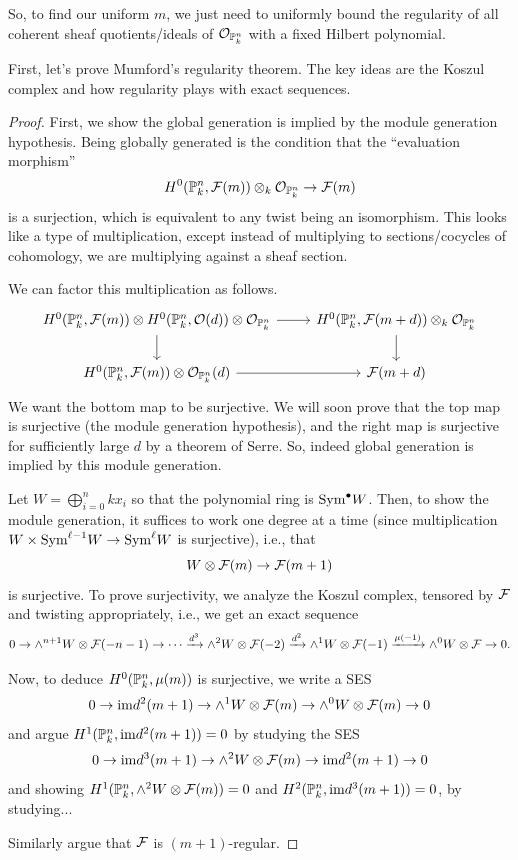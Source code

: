 \documentclass[12pt]{article}
\begin{document}
So, to find our uniform $m$, we just need to uniformly bound the regularity of all coherent sheaf quotients/ideals of $\cO_{\P_k^n}$ with a fixed Hilbert polynomial.

First, let's prove Mumford's regularity theorem. The key ideas are the Koszul complex and how regularity plays with exact sequences.

\begin{proof}
    First, we show the global generation is implied by the module generation hypothesis. Being globally generated is the condition that the ``evaluation morphism''
    \[H^0(\P^n_k, \cF(m)) \otimes_k \cO_{\P_k^n} \to \cF(m)\]
    is a surjection, which is equivalent to any twist being an isomorphism. This looks like a type of multiplication, except instead of multiplying to sections/cocycles of cohomology, we are multiplying against a sheaf section.

    We can factor this multiplication as follows.
    \[\begin{tikzcd}
        H^0(\P^n_k, \cF(m)) \otimes H^0(\P^n_k, \cO(d)) \otimes \cO_{\P^n_k} \dar \rar & H^0(\P^n_k, \cF(m+d)) \otimes_k \cO_{\P^n_k} \dar\\
        H^0(\P^n_k, \cF(m)) \otimes \cO_{\P^n_k}(d) \rar & \cF(m+d)
    \end{tikzcd}\]
    We want the bottom map to be surjective. We will soon prove that the top map is surjective (the module generation hypothesis), and the right map is surjective for sufficiently large $d$ by a theorem of Serre. So, indeed global generation is implied by this module generation.

    Let $W = \bigoplus_{i=0}^n kx_i$ so that the polynomial ring is $\Sym^\bullet W$. Then, to show the module generation, it suffices to work one degree at a time (since multiplication $W\times \Sym^{\ell - 1} W \to \Sym^\ell W$ is surjective), i.e., that
    \[W \otimes \cF(m) \to \cF(m+1)\]
    is surjective. To prove surjectivity, we analyze the Koszul complex, tensored by $\cF$ and twisting appropriately, i.e., we get an exact sequence
    \[0\to \wedge^{n+1} W \otimes \cF(-n-1) \to \cdots \xrightarrow{d^3} \wedge^2 W \otimes \cF(-2) \xrightarrow{d^2} \wedge^1 W \otimes \cF(-1) \xrightarrow{\mu(-1)} \wedge^0 W \otimes \cF \to 0.\]

    Now, to deduce $H^0(\P^n_k,\mu(m))$ is surjective, we write a SES
    \[0\to \im d^2(m+1) \to \wedge^1 W \otimes \cF(m) \to \wedge^0 W \otimes \cF(m) \to 0\]
    and argue $H^1(\P^n_k, \im d^2(m+1))=0$ by studying the SES
    \[0 \to \im d^3(m+1) \to \wedge^2 W \otimes \cF(m) \to \im d^2(m+1) \to 0\]
    and showing $H^1(\P^n_k, \wedge^2 W\otimes \cF(m))=0$ and $H^2(\P^n_k, \im d^3(m+1)) = 0$, by studying...

    Similarly argue that $\cF$ is $(m+1)$-regular.
\end{proof}
\end{document}
